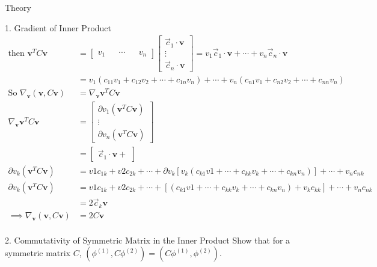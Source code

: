 \begin{section}{Theory}
\begin{homeworkSection}{1. Gradient of Inner Product}
{\begin{align*}
		\text{then } \bm{v}^T C\bm{v} &= \begin{bmatrix} v_1 &&  \cdots && v_n \end{bmatrix}
				\begin{bmatrix} \vec{c}_1 \cdot \bm{v} \\ \vdots \\ \vec{c}_n \cdot \bm{v} \end{bmatrix}
			= v_1 \vec{c}_1 \cdot \bm{v} + \cdots + v_ n \vec{c}_n \cdot \bm{v} \\
		&= v_1 (c_{11} v_1 + c_{12} v_2 + \cdots + c_{1n}v_n)  + \cdots + v_n (c_{n1} v_1 + c_{n2} v_2 + \cdots + c_{nn}v_n) \\ 
		\text{So } \nabla_{\bm{v}} (\bm{v}, C\bm{v}) &= \nabla_{\bm{v}} \bm{v}^T C\bm{v} \\
		\nabla_{\bm{v}} \bm{v}^T C\bm{v} &= 
			\begin{bmatrix} \partial v_1 (\bm{v}^T C\bm{v}) \\ \vdots \\ \partial v_n (\bm{v}^T C\bm{v}) \end{bmatrix} \\
		&= \begin{bmatrix} \vec{c}_1 \cdot \bm{v} + \end{bmatrix} \\
		\partial v_k (\bm{v}^T C\bm{v}) &= v1 c_{1k} + v2 c_{2k} + \cdots + \partial v_k \left [ v_k (c_{k1}v1 + \cdots + c_{kk}v_k + \cdots + c_{kn}v_n) \right ] + \cdots + v_n c_{nk}
		\\
		\partial v_k (\bm{v}^T C\bm{v}) &= v1 c_{1k} + v2 c_{2k} + \cdots + \left [ (c_{k1}v1 + \cdots + c_{kk}v_k + \cdots + c_{kn}v_n ) + v_k c_{kk} \right ] + \cdots + v_n c_{nk} \\
		&= 2 \vec{c}_k \bm{v} \\
		\implies \nabla_{\bm{v}} (\bm{v}, C\bm{v}) &= 2 C \bm{v} \\
	\end{align*}
}

\end{homeworkSection}

\begin{homeworkSection}{2. Commutativity of Symmetric Matrix in the Inner Product}
Show that for a symmetric matrix $C$, $( \phi^{(1)}, C\phi^{(2)} ) = ( C\phi^{(1)}, \phi^{(2)} )$.



\end{homeworkSection}
\end{section}
